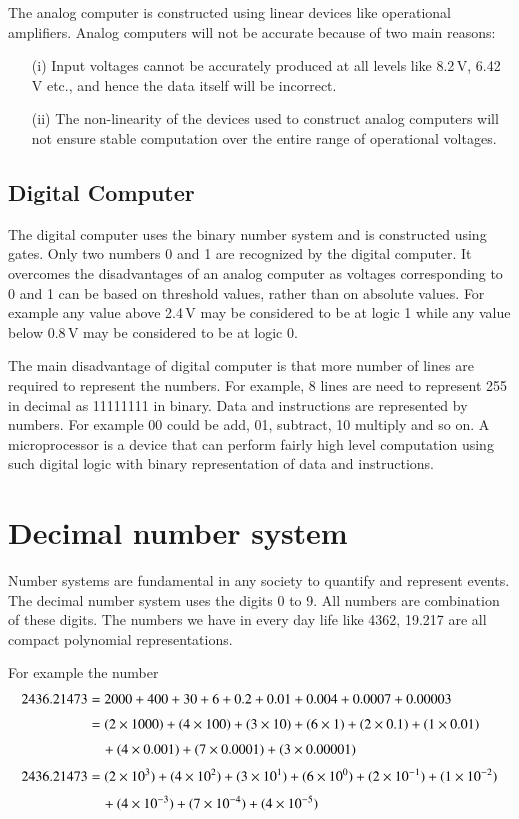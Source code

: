 The analog computer is constructed using linear devices like operational amplifiers. Analog computers will not be accurate because of two main reasons:
\begin{itemize}
\item[(i)] Input voltages cannot be accurately produced at all levels like 8.2\,V, 6.42\,V etc., and hence the data itself will be incorrect.

\item[(ii)] The non-linearity of the devices used to construct analog computers will not ensure stable computation over the entire range of operational voltages.
\end{itemize}

\subsection{Digital Computer}\label{sec6.1.2}

The digital computer uses the binary number system and is constructed using gates. Only two numbers 0 and 1 are recognized by the digital computer. It overcomes the disadvantages of an analog computer as voltages corresponding to 0 and 1 can be based on threshold values, rather than on absolute values. For example any value above 2.4\,V may be considered to be at logic 1 while any value below 0.8\,V may be considered to be at logic 0.

The main disadvantage of digital computer is that more number of lines are required to represent the numbers. For example, 8 lines are need to represent 255 in decimal as 11111111 in binary. Data and instructions are represented by numbers. For example 00 could be add, 01, subtract, 10 multiply and so on. A microprocessor is a device that can perform fairly high level computation using such digital logic with binary representation of data and instructions.

\section{Decimal number system}\label{sec6.2}

Number systems are fundamental in any society to quantify and represent events. The decimal number system uses the digits 0 to 9. All numbers are combination of these digits. The numbers we have in every day life like 4362, 19.217 are all compact polynomial representations.

For example the number
\begin{align}
2436.21473 &= 2000+400+30+6+0.2+0.01+0.004+0.0007+0.00003\notag\\[3pt]
           &= (2\times 1000)+(4\times 100)+(3\times 10)+(6\times 1)+(2\times 0.1)+(1\times 0.01)\notag\\[3pt]
           &\quad +(4\times 0.001)+(7\times 0.0001)+(3\times 0.00001)\notag\\[3pt]
2436.21473 &= (2\times 10^{3})+(4\times 10^{2})+(3\times 10^{1})+(6\times 10^{0})+(2\times 10^{-1})+(1\times 10^{-2})\notag\\[3pt]
&\quad +(4\times 10^{-3})+(7\times 10^{-4})+(4\times 10^{-5})\label{eq6.1}
\end{align}


